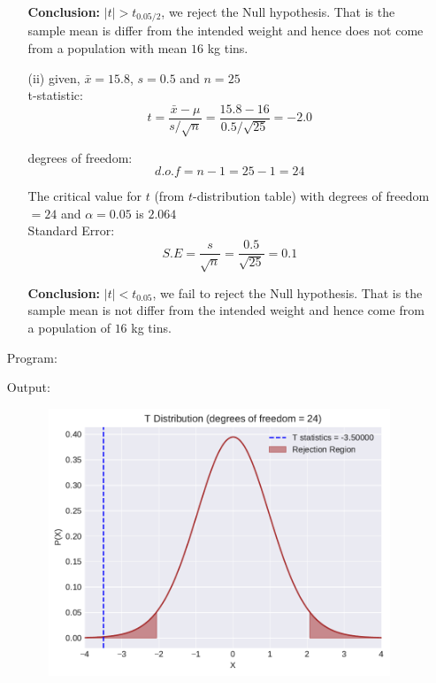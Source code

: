 \documentclass[a4paper,11pt,openright]{report}
\begin{document}
\begin{enumerate}
\begin{enumerate}
\textbf{Conclusion:} $|t| > t_{0.05/2}$, we reject the Null hypothesis. That is the sample
mean is differ from the intended weight and hence does not come from a population with mean
$16$ kg tins. \\

\item[(ii)] given, $\bar x = 15.8$, $s = 0.5$ and $n = 25$ \\

t-statistic:
\begin{equation*}
t = \frac{\bar x - \mu}{s/\sqrt{n}}
  = \frac{15.8 - 16}{0.5/\sqrt{25}}
  = -2.0
\end{equation*}	

degrees of freedom:
\begin{equation*}
d.o.f = n - 1 = 25 - 1 = 24
\end{equation*}

The critical value for $t$ (from $t$-distribution table) with degrees of freedom $= 24$ and
$\alpha = 0.05$ is $2.064$ \\

Standard Error:
\begin{equation*}
S.E = \frac{s}{\sqrt{n}} = \frac{0.5}{\sqrt{25}} = 0.1
\end{equation*} 

\textbf{Conclusion:} $|t| < t_{0.05}$, we fail to reject the Null hypothesis. That is the
sample mean is not differ from the intended weight and hence come from a population of $16$ 
kg tins.

\end{enumerate}

\vspace{0.5cm}

Program:


\vspace{0.5cm}

Output:


\begin{figure}[ht!]
\includegraphics[width=16cm,height=8cm,keepaspectratio]{tscript1a.pdf}
\centering
\end{figure}


\end{enumerate}
\end{document}
